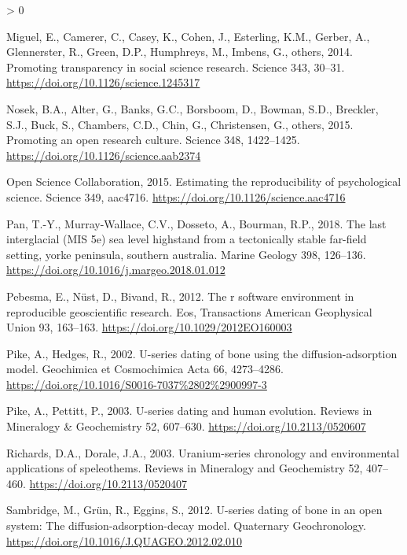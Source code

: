 \documentclass[]{elsarticle} %
\newlength{\cslhangindent}
\newenvironment{CSLReferences}[2] %
 {%
  \setlength{\parindent}{0pt}
  \ifodd #1 \everypar{\setlength{\hangindent}{\cslhangindent}}\ignorespaces\fi
  \ifnum #2 > 0
  \setlength{\parskip}{#2\baselineskip}
  \fi
 }%
 {}
\begin{document}
\begin{CSLReferences}{1}{0}
\leavevmode\hypertarget{ref-miguel2014promoting}{}%
Miguel, E., Camerer, C., Casey, K., Cohen, J., Esterling, K.M., Gerber, A., Glennerster, R., Green, D.P., Humphreys, M., Imbens, G., others, 2014. Promoting transparency in social science research. Science 343, 30--31. \url{https://doi.org/10.1126/science.1245317}

\leavevmode\hypertarget{ref-nosek2015promoting}{}%
Nosek, B.A., Alter, G., Banks, G.C., Borsboom, D., Bowman, S.D., Breckler, S.J., Buck, S., Chambers, C.D., Chin, G., Christensen, G., others, 2015. Promoting an open research culture. Science 348, 1422--1425. \url{https://doi.org/10.1126/science.aab2374}

\leavevmode\hypertarget{ref-open2015estimating}{}%
Open Science Collaboration, 2015. Estimating the reproducibility of psychological science. Science 349, aac4716. \url{https://doi.org/10.1126/science.aac4716}

\leavevmode\hypertarget{ref-RN5108}{}%
Pan, T.-Y., Murray-Wallace, C.V., Dosseto, A., Bourman, R.P., 2018. The last interglacial (MIS 5e) sea level highstand from a tectonically stable far-field setting, yorke peninsula, southern australia. Marine Geology 398, 126--136. \url{https://doi.org/10.1016/j.margeo.2018.01.012}

\leavevmode\hypertarget{ref-Pebesma_Nust_Bivand_2012}{}%
Pebesma, E., Nüst, D., Bivand, R., 2012. The r software environment in reproducible geoscientific research. Eos, Transactions American Geophysical Union 93, 163--163. \url{https://doi.org/10.1029/2012EO160003}

\leavevmode\hypertarget{ref-RN2996}{}%
Pike, A., Hedges, R., 2002. U-series dating of bone using the diffusion-adsorption model. Geochimica et Cosmochimica Acta 66, 4273--4286. \url{https://doi.org/10.1016/S0016-7037\%2802\%2900997-3}

\leavevmode\hypertarget{ref-Pike2003UseriesDA}{}%
Pike, A., Pettitt, P., 2003. U-series dating and human evolution. Reviews in Mineralogy \& Geochemistry 52, 607--630. \url{https://doi.org/10.2113/0520607}

\leavevmode\hypertarget{ref-RN4494}{}%
Richards, D.A., Dorale, J.A., 2003. Uranium-series chronology and environmental applications of speleothems. Reviews in Mineralogy and Geochemistry 52, 407--460. \url{https://doi.org/10.2113/0520407}

\leavevmode\hypertarget{ref-Sambridge2012}{}%
Sambridge, M., Grün, R., Eggins, S., 2012. U-series dating of bone in an open system: The diffusion-adsorption-decay model. Quaternary Geochronology. \url{https://doi.org/10.1016/J.QUAGEO.2012.02.010}


\end{CSLReferences}
\end{document}
